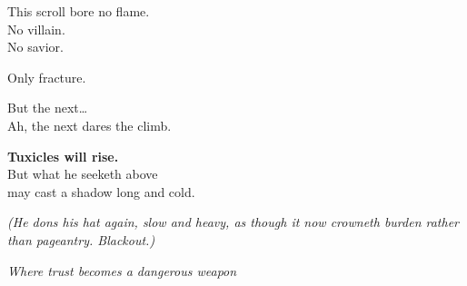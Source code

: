 This scroll bore no flame.\\
No villain.\\
No savior.

Only fracture.

But the next\ldots{}\\
Ah, the next dares the climb.

\textbf{Tuxicles will rise.}\\
But what he seeketh above\\
may cast a shadow long and cold.

\emph{(He dons his hat again, slow and heavy, as though it now crowneth burden rather than pageantry. Blackout.)}

\bookdivider

\emph{Where trust becomes a dangerous weapon}

\bookdivider
